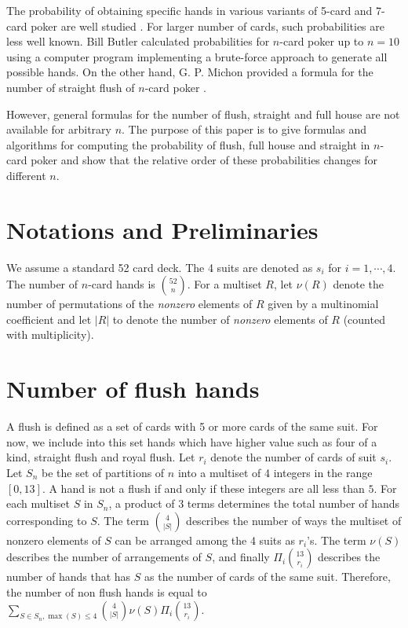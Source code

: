 \documentclass{article}
\begin{document}
The probability of obtaining specific hands in various variants of 5-card and 7-card poker are well studied \cite{wiki:Poker_probability}. For larger number of cards, such probabilities are less well known. Bill Butler \cite{durangobill:poker} calculated probabilities for $n$-card poker up to $n=10$ using a computer program implementing a brute-force approach to generate all possible hands. On the other hand, G. P. Michon provided a formula for the number of straight flush of $n$-card poker \cite{michon,oeisA143314}. 

However, general formulas for the number of flush, straight and full house are not available for arbitrary $n$.
The purpose of this paper is to give formulas and algorithms for computing the probability of flush, full house and straight in $n$-card poker and show that the relative order of these probabilities changes for different $n$.

\section{Notations and Preliminaries}
We assume a standard 52 card deck. The 4 suits are denoted as $s_i$ for $i=1,\cdots,4$. The number of $n$-card hands is $\binom{52}{n}$. For a multiset $R$, let $\nu(R)$ denote the number of permutations of the {\em nonzero} elements of $R$ given by a multinomial coefficient \cite{wiki:Permutation} and let $|R|$ to denote the number of {\em nonzero} elements of $R$ (counted with multiplicity). 

\section{Number of flush hands} \label{sec:flush}
A flush is defined as a set of cards with 5 or more cards of the same suit.
For now, we include into this set hands which have higher value such as four of a kind, straight flush and royal flush.
Let $r_i$ denote the number of cards of suit $s_i$. Let $S_n$
be the set of partitions of $n$ into a multiset of 4 integers in the range $[0,13]$. A hand is not a flush if and only if these integers are all less than $5$. 
For each multiset $S$ in $S_n$, a product of $3$ terms determines the total number of hands corresponding to $S$. The term $\binom{4}{|S|}$ describes the number of ways the multiset of nonzero elements of $S$ can be arranged among the 4 suits as $r_i$'s. The term $\nu(S)$ describes the number of arrangements of $S$, and finally $\Pi_i\binom{13}{r_i}$ describes the number of hands that has $S$ as the number of cards of the same suit.
Therefore, the number of non flush hands is equal to 
$\sum_{S\in S_n,\max(S)\leq 4}\binom{4}{|S|}\nu(S)\Pi_i\binom{13}{r_i}$.
\end{document}
